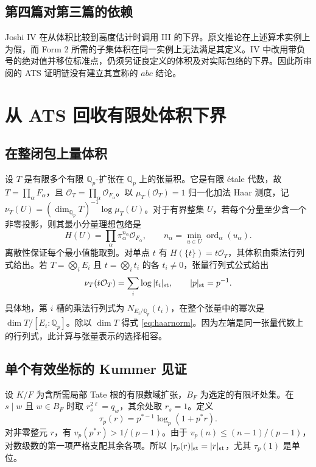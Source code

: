 \documentclass[UTF8,fontset=none,zihao=-4,a4paper]{ctexart}
\newcommand{\OO}{\mathcal O}
\newcommand{\Q}{\mathbb Q}
\newcommand{\ord}{\operatorname{ord}}
\begin{document}
\subsection{第四篇对第三篇的依赖}
Joshi IV 在从体积比较到高度估计时调用 III 的下界。原文推论在上述算术实例上为假，而 Form 2 所需的子集体积在同一实例上无法满足其定义。IV 中改用带负号的绝对值并移位标准点，仍须另证良定义的体积及对实际包络的下界。因此所审阅的 ATS 证明链没有建立其宣称的 \(abc\) 结论。\cite{jiii,jiv}

\appendix
\section{从 ATS 回收有限处体积下界}
\subsection{在整闭包上量体积}
设 \(T\) 是有限多个有限 \(\Q_p\)-扩张在 \(\Q_p\) 上的张量积。它是有限 étale 代数，故 \(T=\prod_\alpha F_\alpha\)，且 \(\OO_T=\prod_\alpha\OO_{F_\alpha}\)。以 \(\mu_T(\OO_T)=1\) 归一化加法 Haar 测度，记 \(\nu_T(U)=(\dim_{\Q_p}T)^{-1}\log\mu_T(U)\)。对于有界整集 \(U\)，若每个分量至少含一个非零投影，则其最小分量理想包络是
\[
 H(U)=\prod_\alpha\pi_\alpha^{n_\alpha}\OO_{F_\alpha},
 \qquad n_\alpha=\min_{u\in U}\ord_\alpha(u_\alpha).
\]
离散性保证每个最小值能取到。对单点 \(t\) 有 \(H(\{t\})=t\OO_T\)，其体积由乘法行列式给出。若 \(T=\bigotimes_i E_i\) 且 \(t=\bigotimes_i t_i\) 的各 \(t_i\ne0\)，张量行列式公式给出
\begin{equation}
 \nu_T(t\OO_T)=\sum_i\log|t_i|_{\rm st},
 \qquad |p|_{\rm st}=p^{-1}. \label{eq:haarnorm}
\end{equation}
具体地，第 \(i\) 槽的乘法行列式为 \(N_{E_i/\Q_p}(t_i)\)，在整个张量中的幂次是 \(\dim T/[E_i:\Q_p]\)。除以 \(\dim T\) 得式 \eqref{eq:haarnorm}。因为左端是同一张量代数上的行列式，此计算与张量表示的选择相容。

\subsection{单个有效坐标的 Kummer 见证}
设 \(K/F\) 为含所需局部 Tate 根的有限数域扩张，\(B_F\) 为选定的有限坏处集。在 \(s\mid w\) 且 \(w\in B_F\) 时取 \(r_s^{2\ell}=q_w\)，其余处取 \(r_s=1\)。定义
\[
 \tau_p(r)=p^{*-1}\log_p(1+p^*r).
\]
对非零整元 \(r\)，有 \(v_p(p^*r)>1/(p-1)\)。由于 \(v_p(n)\le(n-1)/(p-1)\)，对数级数的第一项严格支配其余各项。所以 \(|\tau_p(r)|_{\rm st}=|r|_{\rm st}\)，尤其 \(\tau_p(1)\) 是单位。
\end{document}
